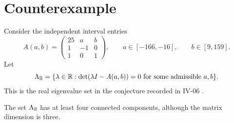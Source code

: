 

\begin{abstract}
A two-parameter interval matrix with integer endpoints has at least four connected components in its real eigenvalue set. Four exact eigenpairs and three exact excluded real numbers provide a short certificate. This disproves the proposed bound of $n$ components for a general $n\times n$ interval matrix.
\end{abstract}
\section{Counterexample}
Consider the independent interval entries
\[
 A(a,b)=\begin{pmatrix}25&a&b\\1&-1&0\\1&0&1\end{pmatrix},
 \qquad a\in[-166,-16],\qquad b\in[9,159].
\]
Let
\[
 \Lambda_{\mathbb R}=\{\lambda\in\mathbb R:\det(\lambda I-A(a,b))=0
                  \text{ for some admissible }a,b\}.
\]
This is the real eigenvalue set in the conjecture recorded in IV-06 \cite{repo}.
\begin{theorem}
The set $\Lambda_{\mathbb R}$ has at least four connected components, although the matrix dimension is three.
\end{theorem}
